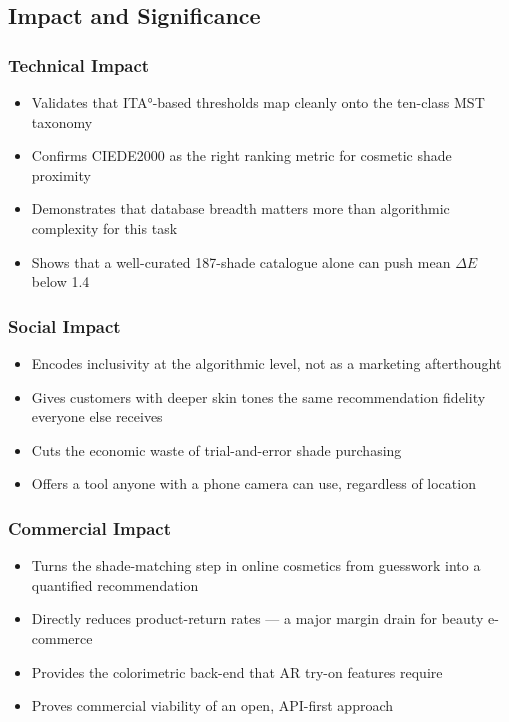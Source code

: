 \subsection{Impact and Significance}

\subsubsection{Technical Impact}

\begin{itemize}
    \item Validates that ITA°-based thresholds map cleanly onto the ten-class MST taxonomy
    \item Confirms CIEDE2000 as the right ranking metric for cosmetic shade proximity
    \item Demonstrates that database breadth matters more than algorithmic complexity for this task
    \item Shows that a well-curated 187-shade catalogue alone can push mean $\Delta E$ below 1.4
\end{itemize}

\subsubsection{Social Impact}

\begin{itemize}
    \item Encodes inclusivity at the algorithmic level, not as a marketing afterthought
    \item Gives customers with deeper skin tones the same recommendation fidelity everyone else receives
    \item Cuts the economic waste of trial-and-error shade purchasing
    \item Offers a tool anyone with a phone camera can use, regardless of location
\end{itemize}

\subsubsection{Commercial Impact}

\begin{itemize}
    \item Turns the shade-matching step in online cosmetics from guesswork into a quantified recommendation
    \item Directly reduces product-return rates — a major margin drain for beauty e-commerce
    \item Provides the colorimetric back-end that AR try-on features require
    \item Proves commercial viability of an open, API-first approach
\end{itemize}

